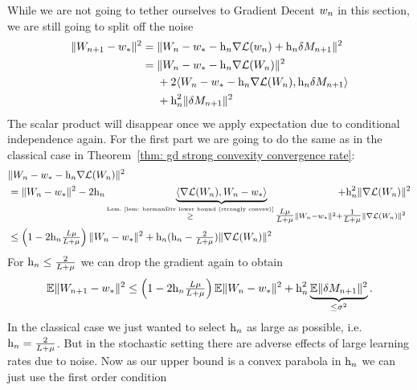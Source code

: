 While we are not going to tether ourselves to Gradient Decent \(w_n\) in
this section, we are still going to split off the noise
\begin{align*}
	\|W_{n+1} - w_*\|^2
	&= \|W_n -w_* - \text{h}_n\nabla\mathcal{L}(w_n) +\text{h}_n \delta M_{n+1}\|^2\\
	&= \begin{aligned}[t]
		&\|W_n - w_* - \text{h}_n\nabla\mathcal{L}(W_n)\|^2\\
		&+ 2\langle W_n - w_* - \text{h}_n\nabla\mathcal{L}(W_n), \text{h}_n \delta M_{n+1}\rangle\\
		&+ \text{h}_n^2 \|\delta M_{n+1}\|^2
	\end{aligned}
\end{align*}
The scalar product will disappear once we apply expectation due to conditional
independence again. For the first part we are going to do the same as in the
classical case in Theorem~\ref{thm: gd strong convexity convergence rate}:
\begin{align}
	\nonumber
	&\|\Weights_n - \minimum - \lr_n\nabla\Loss(\Weights_n)\|^2\\
	\label{eq: getting rid of the scalar product (SGD)}
	&= \|\Weights_n - \minimum\|^2
	- 2\lr_n\underbrace{\langle\nabla\Loss(\Weights_n), \Weights_n-\minimum\rangle}_{
		\xge{\text{Lem.~\ref{lem: bermanDiv lower bound (strongly convex)}}}
	 	\tfrac{\ubound\lbound}{\ubound+\lbound}\|\Weights_n - \minimum\|^2
		\mathrlap{+ \tfrac{1}{\ubound+\lbound}\|\nabla\Loss(\Weights_n)\|^2}
	}
	+ \lr_n^2 \|\nabla\Loss(\Weights_n)\|^2\\
	\nonumber
	&\le \left(1-2\lr_n\tfrac{\ubound\lbound}{\ubound+\lbound}\right)
	\|\Weights_n - \minimum\|^2
	+ \lr_n(\lr_n - \tfrac{2}{\ubound+\lbound})
	\|\nabla\Loss(\Weights_n)\|^2
\end{align}
For \(\text{h}_n\le\tfrac{2}{L+\mu}\) we can drop the gradient again to
obtain
\begin{align*}
	\mathbb{E}\|W_{n+1} - w_*\|^2
	\le \left(1-2\text{h}_n\tfrac{L\mu}{L+\mu}\right)
	\mathbb{E}\|W_n - w_*\|^2 + \text{h}_n^2 \underbrace{\mathbb{E}\|\delta M_{n+1}\|^2}_{\le\sigma^2}.
\end{align*}
In the classical case we just wanted to select \(\text{h}_n\) as large as possible,
i.e. \(\text{h}_n=\tfrac{2}{L+\mu}\). But in the stochastic setting there
are adverse effects of large learning rates due to noise. Now as our upper bound
is a convex parabola in \(\text{h}_n\) we can just use the first order condition
